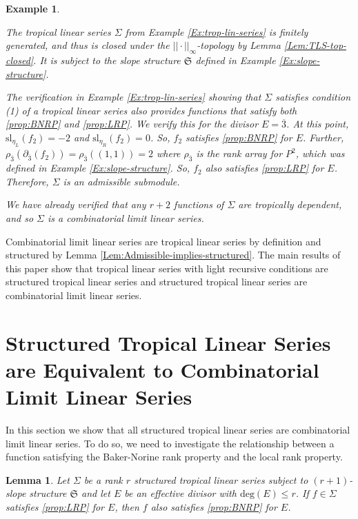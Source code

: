 \documentclass{amsart}
\newtheorem{lemma}[theorem]{Lemma}
\newtheorem{varexample}[theorem]{Example}
\newenvironment{example}{\begin{varexample}
		\begin{normalfont}}{\end{normalfont}
\end{varexample}}
\begin{document}
	\begin{example}
		The tropical linear series $\Sigma$ from Example \ref{Ex:trop-lin-series} is finitely generated, and thus is closed under the $||\cdot||_{\infty}$-topology by Lemma \ref{Lem:TLS-top-closed}. It is subject to the slope structure $\mathfrak{S}$ defined in Example \ref{Ex:slope-structure}. 
		
		The verification in Example \ref{Ex:trop-lin-series} showing that $\Sigma$ satisfies condition (1) of a tropical linear series also provides functions that satisfy both \ref{prop:BNRP} and \ref{prop:LRP}. We verify this for the divisor $E = \overline{3}$. At this point, $\mathrm{sl}_{\eta_L}(f_2) = -2$ and $\mathrm{sl}_{\eta_R}(f_2) = 0$. So, $f_2$ satisfies \ref{prop:BNRP} for $E$. Further, $\rho_{\overline{3}}(\partial_{\overline{3}}(f_2)) = \rho_{\overline{3}}((1,1)) = 2$ where $\rho_{\overline{3}}$ is the rank array for $P^2$, which was defined in Example \ref{Ex:slope-structure}. So, $f_2$ also satisfies \ref{prop:LRP} for $E$. Therefore, $\Sigma$ is an admissible submodule.
		
		We have already verified that any $r+2$ functions of $\Sigma$ are tropically dependent, and so $\Sigma$ is a combinatorial limit linear series. 
	\end{example}
	
	Combinatorial limit linear series are tropical linear series by definition and structured by Lemma \ref{Lem:Admissible-implies-structured}. The main results of this paper show that tropical linear series with light recursive conditions are structured tropical linear series and structured tropical linear series are combinatorial limit linear series.
	
	\section{Structured Tropical Linear Series are Equivalent to Combinatorial Limit Linear Series}
	\label{Sec:Structured-TLS-equiv-to-CLLS}
	
	In this section we show that all structured tropical linear series are combinatorial limit linear series. To do so, we need to investigate the relationship between a function satisfying the Baker-Norine rank property and the local rank property.
	
	\begin{lemma}
		\label{Lem:LRP-implies-BNRP}
		Let $\Sigma$ be a rank $r$ structured tropical linear series subject to $(r+1)$-slope structure $\mathfrak{S}$ and let $E$ be an effective divisor with $\mathrm{deg}(E) \leq r$. If $f \in \Sigma$ satisfies \ref{prop:LRP} for $E$, then $f$ also satisfies \ref{prop:BNRP} for $E$. 
	\end{lemma}
	
\end{document}
